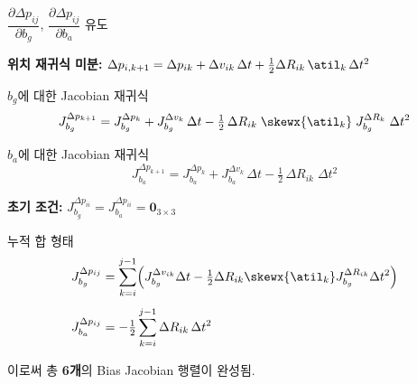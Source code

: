\begin{frame}[shrink=10]{$\dfrac{\partial \Delta p_{ij}}{\partial b_g}$,\; $\dfrac{\partial \Delta p_{ij}}{\partial b_a}$ 유도}

  \textbf{위치 재귀식 미분:}
  $\Delta p_{i,k+1} = \Delta p_{ik} + \Delta v_{ik}\,\Delta t + \tfrac{1}{2}\Delta R_{ik}\,\atil_k\,\Delta t^2$

  \pause
  \begin{block}{$b_g$에 대한 Jacobian 재귀식}
    \[
      J_{b_g}^{\Delta p_{k+1}}
      = J_{b_g}^{\Delta p_k}
        + J_{b_g}^{\Delta v_k}\,\Delta t
        - \tfrac{1}{2}\,\Delta R_{ik}\;\skewx{\atil_k}\;J_{b_g}^{\Delta R_k}\;\Delta t^2
    \]
  \end{block}

  \pause
  \begin{block}{$b_a$에 대한 Jacobian 재귀식}
    \[
      J_{b_a}^{\Delta p_{k+1}}
      = J_{b_a}^{\Delta p_k}
        + J_{b_a}^{\Delta v_k}\,\Delta t
        - \tfrac{1}{2}\,\Delta R_{ik}\;\Delta t^2
    \]
  \end{block}

  \pause
  \textbf{초기 조건:} $J_{b_g}^{\Delta p_{ii}} = J_{b_a}^{\Delta p_{ii}} = \bm{0}_{3\times 3}$

  \pause
  \vspace{0.3em}
  \begin{exampleblock}{누적 합 형태}
    \begin{align*}
      J_{b_g}^{\Delta p_{ij}}
        &= \sum_{k=i}^{j-1}\!\left(
            J_{b_g}^{\Delta v_{ik}}\Delta t
            - \tfrac{1}{2}\Delta R_{ik}\skewx{\atil_k}J_{b_g}^{\Delta R_{ik}}\Delta t^2
          \right)\\[4pt]
      J_{b_a}^{\Delta p_{ij}}
        &= -\tfrac{1}{2}\sum_{k=i}^{j-1}\Delta R_{ik}\,\Delta t^2
    \end{align*}
  \end{exampleblock}

  이로써 총 \textbf{6개}의 Bias Jacobian 행렬이 완성됨.
\end{frame}


